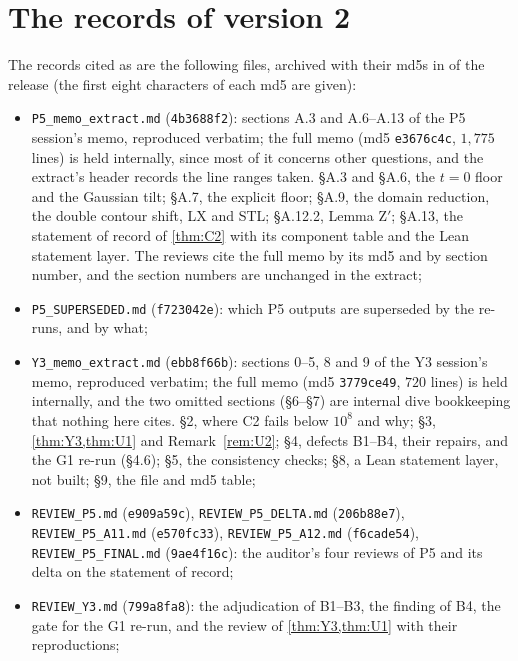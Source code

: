 \documentclass[11pt]{article}
\theoremstyle{definition}
\newcommand{\lean}[1]{\texttt{#1}}
\begin{document}
\section{The records of version 2}\label{app:v2records}

The records cited as \cite{dq1records} are the following files, archived with their md5s in  of the release (the first eight characters of each md5 are given):
\begin{itemize}\small
\item \lean{P5\_\allowbreak{}memo\_\allowbreak{}extract.md} (\lean{4b3688f2}): sections A.3 and A.6--A.13 of the P5 session's memo, reproduced verbatim; the full memo (md5 \lean{e3676c4c}, $1{,}775$ lines) is held internally, since most of it concerns other questions, and the extract's header records the line ranges taken. \S A.3 and \S A.6, the $t = 0$ floor and the Gaussian tilt; \S A.7, the explicit floor; \S A.9, the domain reduction, the double contour shift, LX and STL; \S A.12.2, Lemma Z$'$; \S A.13, the statement of record of \cref{thm:C2} with its component table and the Lean statement layer. The reviews cite the full memo by its md5 and by section number, and the section numbers are unchanged in the extract;
\item \lean{P5\_\allowbreak{}SUPERSEDED.md} (\lean{f723042e}): which P5 outputs are superseded by the re-runs, and by what;
\item \lean{Y3\_\allowbreak{}memo\_\allowbreak{}extract.md} (\lean{ebb8f66b}): sections 0--5, 8 and 9 of the Y3 session's memo, reproduced verbatim; the full memo (md5 \lean{3779ce49}, $720$ lines) is held internally, and the two omitted sections (\S6--\S7) are internal dive bookkeeping that nothing here cites. \S2, where C2 fails below $10^8$ and why; \S3, \cref{thm:Y3,thm:U1} and Remark~\ref{rem:U2}; \S4, defects B1--B4, their repairs, and the G1 re-run (\S4.6); \S5, the consistency checks; \S8, a Lean statement layer, not built; \S9, the file and md5 table;
\item \lean{REVIEW\_\allowbreak{}P5.md} (\lean{e909a59c}), \lean{REVIEW\_\allowbreak{}P5\_\allowbreak{}DELTA.md} (\lean{206b88e7}), \lean{REVIEW\_\allowbreak{}P5\_\allowbreak{}A11.md} (\lean{e570fc33}), \lean{REVIEW\_\allowbreak{}P5\_\allowbreak{}A12.md} (\lean{f6cade54}), \lean{REVIEW\_\allowbreak{}P5\_\allowbreak{}FINAL.md} (\lean{9ae4f16c}): the auditor's four reviews of P5 and its delta on the statement of record;
\item \lean{REVIEW\_\allowbreak{}Y3.md} (\lean{799a8fa8}): the adjudication of B1--B3, the finding of B4, the gate for the G1 re-run, and the review of \cref{thm:Y3,thm:U1} with their reproductions;

\end{itemize}
\end{document}
